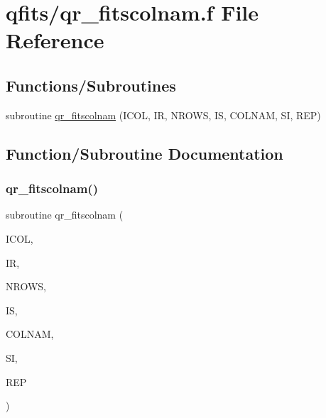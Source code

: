 \hypertarget{qr__fitscolnam_8f}{}\section{qfits/qr\+\_\+fitscolnam.f File Reference}
\label{qr__fitscolnam_8f}
\subsection*{Functions/\+Subroutines}
\begin{DoxyCompactItemize}
\item 
subroutine \hyperlink{qr__fitscolnam_8f_a377df08945ef9aa72001ecba74cf3e66}{qr\+\_\+fitscolnam} (I\+C\+OL, IR, N\+R\+O\+WS, IS, C\+O\+L\+N\+AM, SI, R\+EP)
\end{DoxyCompactItemize}


\subsection{Function/\+Subroutine Documentation}
\mbox{\label{qr__fitscolnam_8f_a377df08945ef9aa72001ecba74cf3e66}} 
\subsubsection{\texorpdfstring{qr\+\_\+fitscolnam()}{qr\_fitscolnam()}}
{\footnotesize\ttfamily subroutine qr\+\_\+fitscolnam (\begin{DoxyParamCaption}\item[{integer}]{I\+C\+OL,  }\item[{integer}]{IR,  }\item[{integer}]{N\+R\+O\+WS,  }\item[{integer}]{IS,  }\item[{character, dimension(is)}]{C\+O\+L\+N\+AM,  }\item[{integer}]{SI,  }\item[{integer, dimension(nrows)}]{R\+EP }\end{DoxyParamCaption})}

